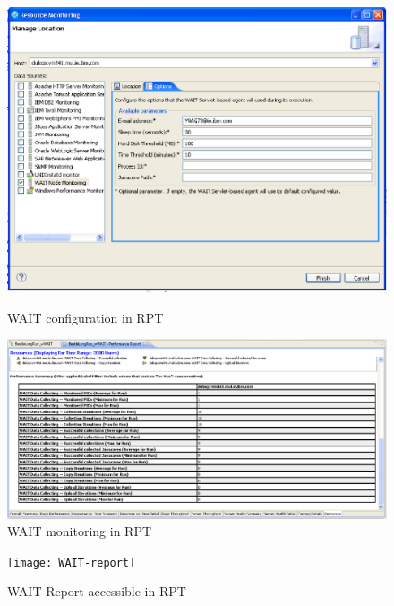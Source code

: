\documentclass[runningheads,a4paper]{llncs}
\begin{document}
\begin{figure}
\centering
\begin{minipage}[b]{.45\textwidth}

\centering
\includegraphics[totalheight=.3\textheight,width=1.0\textwidth]{WAIT-config}
\caption{WAIT configuration in RPT}
\label{fig_config}

\end{minipage}\qquad
\begin{minipage}[b]{.45\textwidth}

\centering
\includegraphics[totalheight=.3\textheight,width=1.0\textwidth]{WAIT-monitoring}
\caption{WAIT monitoring in RPT}
\label{fig_mon}

\end{minipage}
\end{figure}
\vspace{-5pt}

\vspace{-5pt}
\begin{figure}[!h]
\centering
\texttt{[image: WAIT-report]}
\caption{WAIT Report accessible in RPT}
\label{fig_report}
\end{figure}
\vspace{-5pt}
\vspace{-5pt}
\end{document}
